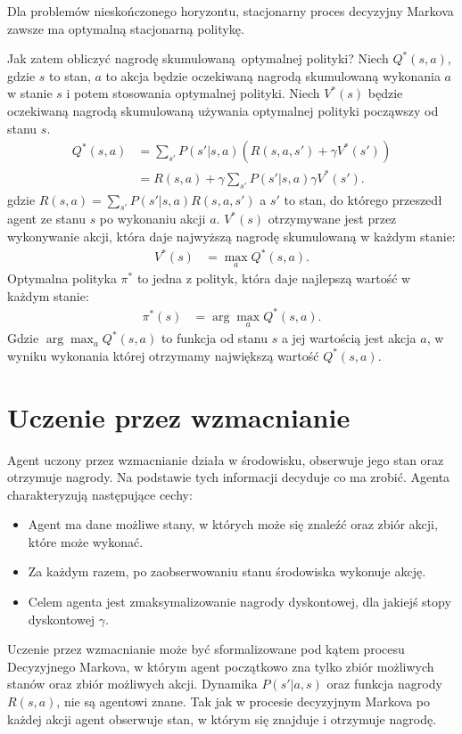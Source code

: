 \documentclass[a4paper, 12pt,twoside]{report}
\begin{document}
Dla problemów nieskończonego horyzontu, stacjonarny proces decyzyjny Markova
zawsze ma optymalną stacjonarną politykę. \cite{ai_foundations_policies}

Jak zatem obliczyć nagrodę skumulowaną optymalnej polityki? Niech $Q^*(s,a)$,
gdzie $s$ to stan, $a$ to akcja będzie oczekiwaną nagrodą skumulowaną wykonania
$a$ w stanie $s$ i potem stosowania optymalnej polityki. Niech $V^*(s)$ będzie
oczekiwaną nagrodą skumulowaną używania optymalnej polityki począwszy od stanu
$s$.
\begin{equation} \label{optimal_policy_1}
\begin{split}
	Q^*(s,a) &= \sum_{s'}P(s'|s,a)(R(s,a,s') + \gamma V^*(s'))\\
	&= R(s,a) + \gamma \sum_{s'}P(s'|s,a) \gamma V^*(s').
\end{split}
\end{equation}
gdzie $R(s,a) = \sum_{s'}P(s'|s,a)R(s,a,s')$ a $s'$ to stan, do którego
przeszedł agent ze stanu $s$ po wykonaniu akcji $a$.
$V^*(s)$ otrzymywane jest przez wykonywanie akcji, która daje najwyższą nagrodę
skumulowaną w każdym stanie:
\begin{equation} \label{optimal_policy_2}
\begin{split}
	V^*(s) &= \max_{a} Q^*(s,a).
\end{split}
\end{equation}
Optymalna polityka $\pi^*$ to jedna z polityk, która daje najlepszą wartość w
każdym stanie:
\begin{equation} \label{optimal_policy_3}
\begin{split}
	\pi^*(s) &= \arg\max_{a} Q^*(s,a).
\end{split}
\end{equation}
Gdzie $\arg\max_{a} Q^*(s,a)$ to funkcja od stanu $s$ a jej wartością jest
akcja $a$, w wyniku wykonania której otrzymamy największą wartość $Q^*(s,a)$.

\section{Uczenie przez wzmacnianie}
Agent uczony przez wzmacnianie działa w środowisku, obserwuje jego stan oraz
otrzymuje nagrody. Na podstawie tych informacji decyduje co ma zrobić. Agenta
charakteryzują następujące cechy:
\begin{itemize}
	\setlength\itemsep{-0.4em}
\item Agent ma dane możliwe stany, w których może się znaleźć oraz zbiór akcji,
	które może wykonać.
\item Za każdym razem, po zaobserwowaniu stanu środowiska wykonuje akcję.
\item Celem agenta jest zmaksymalizowanie nagrody dyskontowej, dla jakiejś
	stopy dyskontowej $\gamma$.
\end{itemize}
Uczenie przez wzmacnianie może być sformalizowane pod kątem procesu Decyzyjnego
Markova, w którym agent początkowo zna tylko zbiór możliwych stanów oraz zbiór
możliwych akcji. Dynamika $P(s'|a,s)$ oraz funkcja nagrody $R(s,a)$, nie są
agentowi znane. Tak jak w procesie decyzyjnym Markova po każdej akcji agent
obserwuje stan, w którym się znajduje i otrzymuje nagrodę.
\end{document}
